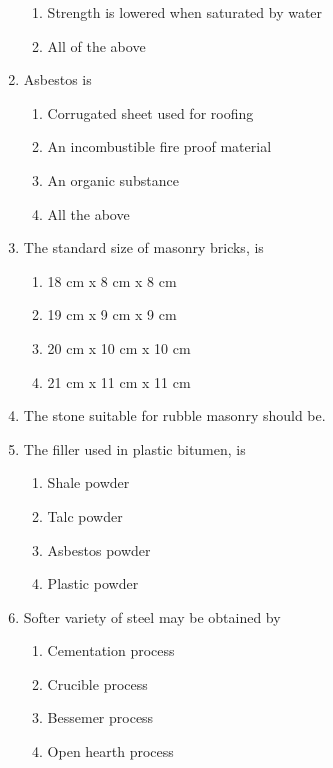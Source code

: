 \documentclass[11pt,a4paper]{article}
\begin{document}
\begin{enumerate}
\begin{enumerate}[label=\Alph*.]
\item{Strength is lowered when saturated by water}
\item{All of the above}
\end{enumerate}
\item{Asbestos is}
\begin{enumerate}[label=\Alph*.]
\item{Corrugated sheet used for roofing}
\item{An incombustible fire proof material}
\item{An organic substance}
\item{All the above}
\end{enumerate}
\item{The standard size of masonry bricks, is}
\begin{enumerate}[label=\Alph*.]
\item{18 cm x 8 cm x 8 cm}
\item{19 cm x 9 cm x 9 cm}
\item{20 cm x 10 cm x 10 cm}
\item{21 cm x 11 cm x 11 cm}
\end{enumerate}
\item{The stone suitable for rubble masonry should be.}
\\
\item{The filler used in plastic bitumen, is}
\begin{enumerate}[label=\Alph*.]
\item{Shale powder}
\item{Talc powder}
\item{Asbestos powder}
\item{Plastic powder}
\end{enumerate}
\item{Softer variety of steel may be obtained by}
\begin{enumerate}[label=\Alph*.]
\item{Cementation process}
\item{Crucible process}
\item{Bessemer process}
\item{Open hearth process}
\end{enumerate}

\end{enumerate}
\end{document}
